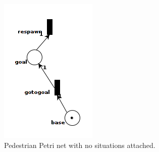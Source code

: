 \documentclass[11pt, a4paper]{book}
\begin{document}
\begin{figure}
\centering
\begin{subfigure}[b]{0.25\textwidth}
\raggedleft
\includegraphics[width=\textwidth]{petrinet_pictures/rotterdamPedestrianNet_before.png}
\caption{Pedestrian Petri net with no situations attached.}
\end{subfigure}
\hspace{0.1\textwidth}
\begin{subfigure}[b]{0.4\textwidth}
\raggedright

\end{subfigure}
\end{figure}
\end{document}
